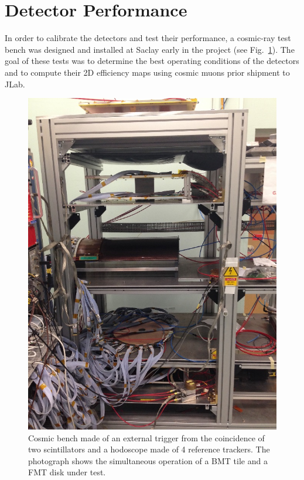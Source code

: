 \section{Detector Performance}

In order to calibrate the detectors and test their performance, a cosmic-ray test bench was designed and installed at Saclay
early in the project (see Fig.~\ref{fig:mm-testbench}). The goal of these tests was to determine the best operating conditions
of the detectors and to compute their 2D efficiency maps using cosmic muons prior shipment to JLab.

\begin{figure}[htb]
 \includegraphics[width=1.0\columnwidth,keepaspectratio]{images/banc_cosmique}
 \caption{Cosmic bench made of an external trigger from the coincidence of two scintillators and a hodoscope made of 4 
reference trackers. The photograph shows the simultaneous operation of a BMT tile and a FMT disk under test.}
 \label{fig:mm-testbench}
\end{figure}

